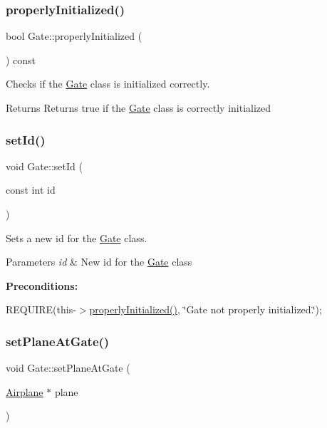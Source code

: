 \subsubsection{\texorpdfstring{properly\+Initialized()}{properlyInitialized()}}
{\footnotesize\ttfamily bool Gate\+::properly\+Initialized (\begin{DoxyParamCaption}{ }\end{DoxyParamCaption}) const}



Checks if the \mbox{\hyperlink{class_gate}{Gate}} class is initialized correctly. 

\begin{DoxyReturn}{Returns}
Returns true if the \mbox{\hyperlink{class_gate}{Gate}} class is correctly initialized 
\end{DoxyReturn}
\mbox{\label{class_gate_aa770ce8dbc324b0c44c1345bb1e77672}} 
\subsubsection{\texorpdfstring{set\+Id()}{setId()}}
{\footnotesize\ttfamily void Gate\+::set\+Id (\begin{DoxyParamCaption}\item[{const int}]{id }\end{DoxyParamCaption})}



Sets a new id for the \mbox{\hyperlink{class_gate}{Gate}} class. 


\begin{DoxyParams}{Parameters}
{\em id} & New id for the \mbox{\hyperlink{class_gate}{Gate}} class\\
\hline
\end{DoxyParams}
{\bfseries Preconditions\+:}
\begin{DoxyItemize}
\item R\+E\+Q\+U\+I\+RE(this-\/$>$\mbox{\hyperlink{class_gate_a51a6794e1e26f03c75f469a6ee8d3432}{properly\+Initialized()}}, \char`\"{}\+Gate not properly initialized.\char`\"{}); 
\end{DoxyItemize}\mbox{\label{class_gate_ad0ff6bff604635299374ccb5b92169f9}} 
\subsubsection{\texorpdfstring{set\+Plane\+At\+Gate()}{setPlaneAtGate()}}
{\footnotesize\ttfamily void Gate\+::set\+Plane\+At\+Gate (\begin{DoxyParamCaption}\item[{\mbox{\hyperlink{class_airplane}{Airplane}} $\ast$}]{plane }\end{DoxyParamCaption})}



